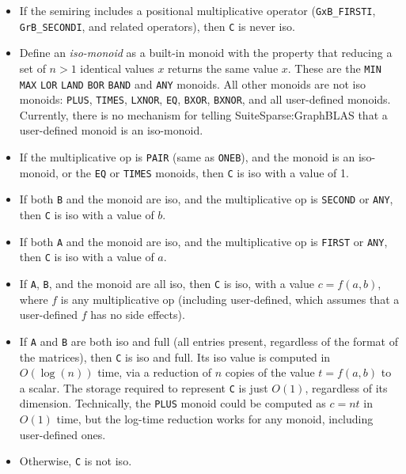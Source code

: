 \documentclass[12pt]{article}
\begin{document}
    \begin{itemize}
    \item If the semiring includes a positional multiplicative operator
    (\verb'GxB_FIRSTI', \verb'GrB_SECONDI', and related operators), then
    \verb'C' is never iso.

    \item Define an {\em iso-monoid} as a built-in monoid with the property
    that reducing a set of $n>1$ identical values $x$ returns the same value
    $x$.  These are the \verb'MIN' \verb'MAX' \verb'LOR' \verb'LAND' \verb'BOR'
    \verb'BAND' and \verb'ANY' monoids.  All other monoids are not iso monoids:
    \verb'PLUS', \verb'TIMES', \verb'LXNOR', \verb'EQ', \verb'BXOR',
    \verb'BXNOR', and all user-defined monoids.   Currently, there is no
    mechanism for telling SuiteSparse:GraphBLAS that a user-defined monoid
    is an iso-monoid.

    \item If the multiplicative op is \verb'PAIR' (same as \verb'ONEB'),
    and the monoid is an
    iso-monoid, or the \verb'EQ' or \verb'TIMES' monoids, then \verb'C' is
    iso with a value of 1.

    \item If both \verb'B' and the monoid are iso, and the multiplicative op is
    \verb'SECOND' or \verb'ANY', then \verb'C' is iso with a value of $b$.

    \item If both \verb'A' and the monoid are iso, and the multiplicative op is
    \verb'FIRST' or \verb'ANY', then \verb'C' is iso with a value of $a$.

    \item If \verb'A', \verb'B', and the monoid are all iso, then \verb'C'
    is iso, with a value $c=f(a,b)$, where $f$ is any multiplicative op
    (including user-defined, which assumes that a user-defined $f$ has no
    side effects).

    \item If \verb'A' and \verb'B' are both iso and full (all entries present,
    regardless of the format of the matrices), then \verb'C' is iso and full.
    Its iso value is computed in $O(\log(n))$ time, via a reduction of $n$
    copies of the value $t=f(a,b)$ to a scalar.  The storage required to
    represent \verb'C' is just $O(1)$, regardless of its dimension.
    Technically, the \verb'PLUS' monoid could be computed as $c=nt$ in $O(1)$
    time, but the log-time reduction works for any monoid, including
    user-defined ones.

    \item Otherwise, \verb'C' is not iso.
    \end{itemize}
\end{document}
